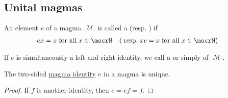 \subsection{Unital magmas}\label{subsec:unital_magmas}

\begin{definition}\label{def:magma_identity}
  An element \( e \) of a magma \( \mscrM \) is called a  (resp. ) if
  \begin{align}\label{eq:def:magma_identity}
    ex = x \T{for all} x \in \mscrM
    &&
    (\T{resp.} xe = x \T{for all} x \in \mscrM)
  \end{align}

  If \( e \) is simultaneously a left and right identity, we call a  or simply  of \( \mscrM \).
\end{definition}

\begin{proposition}\label{thm:magma_identity_unique}
  The two-sided \hyperref[def:magma_identity]{magma identity} \( e \) in a magma is unique.
\end{proposition}
\begin{proof}
  If \( f \) is another identity, then \( e = ef = f \).
\end{proof}

